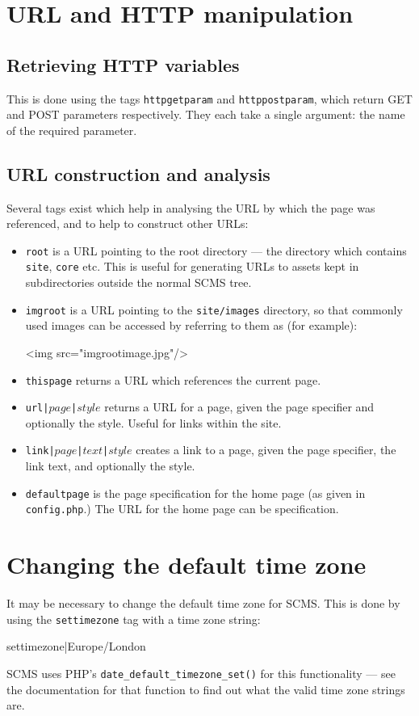\section{URL and HTTP manipulation}
\subsection{Retrieving HTTP variables}
This is done using the tags \texttt{httpgetparam} and \texttt{httppostparam},
which return GET and POST parameters respectively. They each take a single
argument: the name of the required parameter.

\subsection{URL construction and analysis}
Several tags exist which help in analysing the URL by which the page
was referenced, and to help to construct other URLs:
\begin{itemize}
\item \texttt{root} is a URL pointing to the root directory --- the directory
which contains \texttt{site}, \texttt{core} etc. This is useful for
generating URLs to assets kept in subdirectories outside the normal
SCMS tree.
\item \texttt{imgroot} is a URL pointing to the \texttt{site/images}
directory, so that commonly used images can be accessed by referring to them
as (for example):
\begin{MyVerbatim}[commandchars=+\[\]]
<img src="{{imgroot}}image.jpg"/>
\end{MyVerbatim}
\item \texttt{thispage} returns a URL which references the current page.
\item \texttt{url|$page$|$style$} returns a URL for a page, given the page
specifier
and optionally the style. Useful
for links within the site.
\item \texttt{link|$page$|$text$|$style$} creates a link to a page, given the
page specifier, the link text, and optionally the style.
\item \texttt{defaultpage} is the page specification for the home page (as
given in \texttt{config.php}.) The URL for the home page can be
specification.
\end{itemize}

\section{Changing the default time zone}
It may be necessary to change the default time zone for SCMS. This is done
by using the \texttt{settimezone} tag with a time zone string:
\begin{MyVerbatim}[commandchars=+\[\]]
{{settimezone|Europe/London}}
\end{MyVerbatim}
SCMS uses PHP's \texttt{date\_default\_timezone\_set()} for this
functionality --- see the documentation for that function to find
out what the valid time zone strings are.
